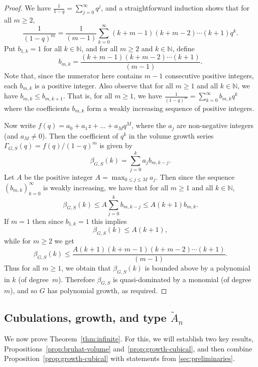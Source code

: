 \documentclass[11pt]{amsart}
\theoremstyle{plain}
\theoremstyle{definition}
\newcommand{\N}{\mathbb{N}}
\newcommand{\G}{\Gamma} %
\numberwithin{equation}{subsection}
\begin{document}
\begin{proof} 
	We have 
	$\frac{1}{1-q} = \sum_{j=0}^\infty q^j$, and a straightforward induction shows that for all $m \geq 2$,
	\[
	\frac{1}{(1-q)^{m}}  = \frac{1}{(m-1)} \sum_{k=0}^\infty (k+m-1)(k+m - 2)\cdots(k+1)q^{k}.
	\]
	Put $b_{1,k} = 1$ for all $k \in \N$, and for all $m \geq 2$ and $k \in \N$, define
	\[
	b_{m,k} = \frac{(k+m-1)(k+m - 2)\cdots(k+1)}{(m-1)}. 
	\]
	Note that, since the numerator here contains $m-1$ consecutive positive integers, each $b_{m,k}$ is a positive integer. Also observe that for all $m \geq 1$ and all $k \in \N$, we have $b_{m,k} \leq b_{m,k+1}$.
	That is, for all $m \geq 1$, we have
	$
	\frac{1}{(1-q)^m} = \sum_{k=0}^\infty b_{m,k} q^k 
	$
	where the coefficients $b_{m,k}$ form a weakly increasing sequence of positive integers.
	
	Now write $f(q) = a_0 + a_1 z + \dots + a_M q^M$, where the $a_j$ are non-negative integers (and $a_M \neq 0$). Then the coefficient of $q^k$ in the volume growth series $\G_{G,S}(q) = f(q)/(1-q)^{m}$ is given by 
	\[ \beta_{G,S}(k)= \sum_{j=0}^k a_j b_{m,k-j}.\]
	Let $A$ be the positive integer $A = \max_{0 \leq j \leq M} a_j$. Then since the sequence $(b_{m,k})_{k=0}^\infty$ is weakly increasing, we have that for all $m \geq 1$ and all $k \in\N$,
	\[
	\beta_{G,S}(k) \leq A \sum_{j=0}^k b_{m,k-j} \leq A(k+1) b_{m,k}.
	\]
	If $m = 1$ then since $b_{1,k} = 1$ this implies \[ \beta_{G,S}(k) \leq A(k+1),\] while for $m \geq 2$ we get
	\[
	\beta_{G,S}(k) \leq \frac{A(k+1)(k+m-1)(k+m - 2)\cdots(k+1)}{(m-1)}. 
	\]
	Thus for all $m \geq 1$, we obtain that $\beta_{G,S}(k)$ is bounded above by a polynomial in $k$ (of degree~$m$). Therefore $\beta_{G,S}$ is quasi-dominated by a monomial (of degree $m$), and so $G$ has polynomial growth, as required.
\end{proof}






\subsection{Cubulations, growth, and type $\tilde{A}_n$}\label{sec:growthCubulations}

We now prove Theorem~\ref{thm:infinite}. For this, we will establish two key results, Propositions~\ref{prop:bruhat-volume} and~\ref{prop:growth-cubical}, and then combine Proposition~\ref{prop:growth-cubical} with statements from %
\cref{sec:preliminaries}.
\end{document}
